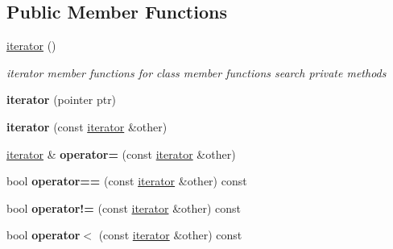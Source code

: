 \subsection*{Public Member Functions}
\begin{DoxyCompactItemize}
\item 
\mbox{\label{classDyn__array_1_1iterator_a81389f49d835ac48ef5006151dd45474}} 
\hyperlink{classDyn__array_1_1iterator_a81389f49d835ac48ef5006151dd45474}{iterator} ()
\begin{DoxyCompactList}\small\item\em iterator member functions for class member functions search private methods \end{DoxyCompactList}\item 
\mbox{\label{classDyn__array_1_1iterator_af2b504d28300de9ce7d47bd94345b560}} 
{\bfseries iterator} (pointer ptr)
\item 
\mbox{\label{classDyn__array_1_1iterator_aa905c1e1b9750b6ba2d29769724974a3}} 
{\bfseries iterator} (const \hyperlink{classDyn__array_1_1iterator}{iterator} \&other)
\item 
\mbox{\label{classDyn__array_1_1iterator_aa71b1d2b6b0639c3367d7a389d0f65a8}} 
\hyperlink{classDyn__array_1_1iterator}{iterator} \& {\bfseries operator=} (const \hyperlink{classDyn__array_1_1iterator}{iterator} \&other)
\item 
\mbox{\label{classDyn__array_1_1iterator_a80f66e9bd59a095027c36cd8e09837df}} 
bool {\bfseries operator==} (const \hyperlink{classDyn__array_1_1iterator}{iterator} \&other) const
\item 
\mbox{\label{classDyn__array_1_1iterator_adcbc373f84600fe75f0f91fae7f4b3db}} 
bool {\bfseries operator!=} (const \hyperlink{classDyn__array_1_1iterator}{iterator} \&other) const
\item 
\mbox{\label{classDyn__array_1_1iterator_a9e790984dbb62081492632e4b90e0e32}} 
bool {\bfseries operator$<$} (const \hyperlink{classDyn__array_1_1iterator}{iterator} \&other) const
\item 

\end{DoxyCompactItemize}
